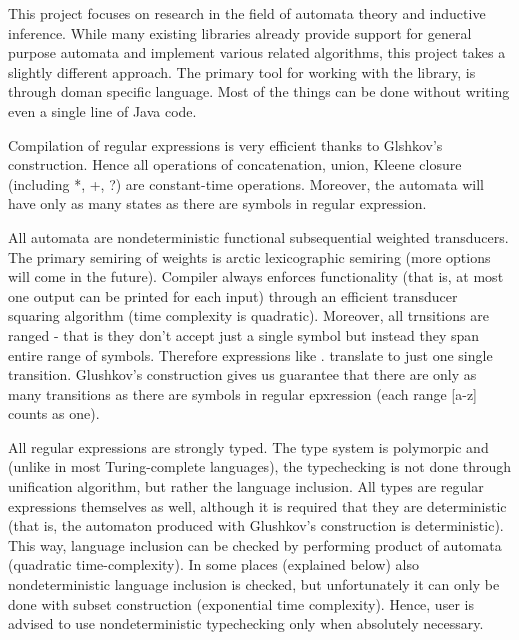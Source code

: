 \documentclass[oneside,polski,logo]{amuthesis}
\author{Bohdan Bondar, Marcin Jałoński, Aleksander Mendoza-Drosik}
\date{Poznań, luty 2021}
\begin{document}
\maketitle
\makestatement

\begin{streszczenie}
This project focuses on research in the field of automata theory and inductive inference. While many existing libraries already provide support for general purpose automata and implement various related algorithms, this project takes a slightly different approach. The primary tool for working with the library, is through doman specific language. Most of the things can be done without writing even a single line of Java code.


Compilation of regular expressions is very efficient thanks to Glshkov's construction. Hence all operations of concatenation, union, Kleene closure (including *, +, ?) are constant-time operations. Moreover, the automata will have only as many states as there are symbols in regular expression.


All automata are nondeterministic functional subsequential weighted transducers. The primary semiring of weights is arctic lexicographic semiring (more options will come in the future). Compiler always enforces functionality (that is, at most one output can be printed for each input) through an efficient transducer squaring algorithm (time complexity is quadratic). Moreover, all trnsitions are ranged - that is they don't accept just a single symbol but instead they span entire range of symbols. Therefore expressions like . translate to just one single transition. Glushkov's construction gives us guarantee that there are only as many transitions as there are symbols in regular epxression (each range [a-z] counts as one).


All regular expressions are strongly typed. The type system is polymorpic and (unlike in most Turing-complete languages), the typechecking is not done through unification algorithm, but rather the language inclusion. All types are regular expressions themselves as well, although it is required that they are deterministic (that is, the automaton produced with Glushkov's construction is deterministic). This way, language inclusion can be checked by performing product of automata (quadratic time-complexity). In some places (explained below) also nondeterministic language inclusion is checked, but unfortunately it can only be done with subset construction (exponential time complexity). Hence, user is advised to use nondeterministic typechecking only when absolutely necessary.



\end{streszczenie}
\end{document}
